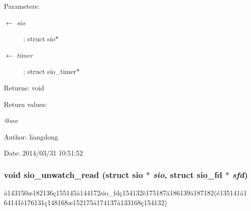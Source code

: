 \begin{Desc}
\item[Parameters:]
\begin{description}
\item[\mbox{$\leftarrow$} {\em sio}]: struct sio$\ast$ \item[\mbox{$\leftarrow$} {\em timer}]: struct sio\_\-timer$\ast$ \end{description}
\end{Desc}
\begin{Desc}
\item[Returns:]void \end{Desc}
\begin{Desc}
\item[Return values:]
\begin{description}
\item[{\em @see}]\end{description}
\end{Desc}
\begin{Desc}
\item[Author:]liangdong \end{Desc}
\begin{Desc}
\item[Date:]2014/03/31 10:51:52 \end{Desc}
\subsubsection{\setlength{\rightskip}{0pt plus 5cm}void sio\_\-unwatch\_\-read (struct sio $\ast$ {\em sio}, struct sio\_\-fd $\ast$ {\em sfd})}\label{sio_8c_a10}


\aa{}143150\ae{}182136\c{c}155145\aa{}144172sio\_\-fd\c{c}154132\`{e}175187\"{a}186139\"{a}187182(\'{e}135141\aa{}164141\`{e}176131\c{c}148168\ae{}152175\aa{}174137\aa{}133168\c{c}154132) 

